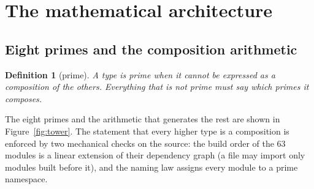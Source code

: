 \documentclass[11pt,a4paper]{article}
\newtheorem{definition}{Definition}
\begin{document}
\section{The mathematical architecture}\label{sec:maths}

\subsection{Eight primes and the composition arithmetic}\label{sec:primes}

\begin{definition}[prime]
A type is \emph{prime} when it cannot be expressed as a composition of the others. Everything that is not prime must say which primes it composes.
\end{definition}

The eight primes and the arithmetic that generates the rest are shown in Figure~\ref{fig:tower}. The statement that every higher type is a composition is enforced by two mechanical checks on the source: the build order of the 63 modules is a linear extension of their dependency graph (a file may import only modules built before it), and the naming law assigns every module to a prime namespace.
\end{document}
